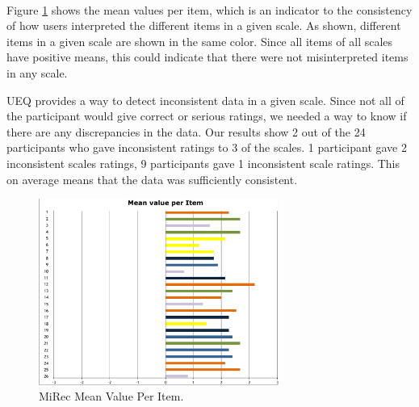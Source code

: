 \\
Figure \ref{fig:figure56} shows the mean values per item, which is an indicator
to the consistency of how users interpreted the different items in a given
scale. As shown, different items in a given scale are shown in the same color.
Since all items of all scales have positive means, this could indicate that
there were not misinterpreted items in any scale. \par

UEQ provides a way to detect inconsistent data in a given scale. Since not all
of the participant would give correct or serious ratings, we needed a way to
know if there are any discrepancies in the data. Our results show 2 out of
the 24 participants who gave inconsistent ratings to 3 of the scales. 1
participant gave 2 inconsistent scales ratings, 9 participants gave 1
inconsistent scale ratings. This on average means that the data was sufficiently
consistent.
\begin{figure}[!htbp]
\centering
\includegraphics[width=0.7\textwidth]{figures/mirec-results3}
\caption{MiRec Mean Value Per Item.}
\label{fig:figure56}
\end{figure}
